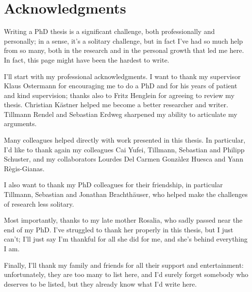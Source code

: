 
\chapter{Acknowledgments}
Writing a PhD thesis is a significant challenge, both professionally and
personally; in a sense, it's a solitary challenge, but in fact I've had so much
help from so many, both in the research and in the personal growth that led me
here. In fact, this page might have been the hardest to write.

I'll start with my professional acknowledgments. I want to thank my supervisor
Klaus Ostermann for encouraging me to do a PhD and for his years of patient and
kind supervision; thanks also to Fritz Henglein for agreeing to review my
thesis. Christian Kästner helped me become a better researcher and writer.
Tillmann Rendel and Sebastian Erdweg sharpened my ability to articulate my
arguments.

Many colleagues helped directly with work presented in this thesis. In
particular, I'd like to thank again my colleagues Cai Yufei, Tillmann, Sebastian
and Philipp Schuster, and my collaborators Lourdes Del Carmen Gonzàlez Huesca and
Yann Règis-Gianas.

I also want to thank my PhD colleagues for their friendship, in particular
Tillmann, Sebastian and Jonathan Brachthäuser, who helped make the challenges of
research less solitary.

Most importantly, thanks to my late mother Rosalia, who sadly passed near the end of my
PhD. I've struggled to thank her properly in this thesis, but I just can't; I'll
just say I'm thankful for all she did for me, and she's behind everything I am.

Finally, I'll thank my family and friends for all their support and
entertainment: unfortunately, they are too many to list here, and I'd surely
forget somebody who deserves to be listed, but they already know what I'd write
here.



